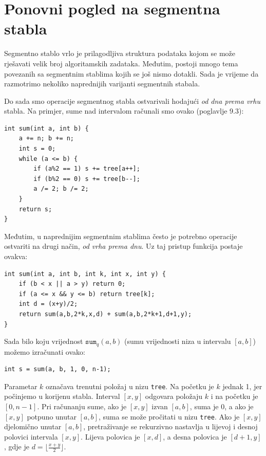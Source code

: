 \chapter{Ponovni pogled na segmentna stabla}


Segmentno stablo vrlo je prilagodljiva struktura podataka
kojom se može rješavati velik broj algoritamskih zadataka.
Međutim, postoji mnogo tema povezanih sa segmentnim stablima
kojih se još nismo dotakli.
Sada je vrijeme da razmotrimo nekoliko naprednijih varijanti
segmentnih stabala.

Do sada smo operacije segmentnog stabla
ostvarivali hodajući \emph{od dna prema vrhu}
stabla.
Na primjer, sume nad intervalom
računali smo ovako (poglavlje 9.3):

\begin{lstlisting}
int sum(int a, int b) {
    a += n; b += n;
    int s = 0;
    while (a <= b) {
        if (a%2 == 1) s += tree[a++];
        if (b%2 == 0) s += tree[b--];
        a /= 2; b /= 2;
    }
    return s;
}
\end{lstlisting}

Međutim, u naprednijim segmentnim stablima
često je potrebno operacije ostvariti
na drugi način, \emph{od vrha prema dnu}.
Uz taj pristup funkcija postaje ovakva:
\begin{lstlisting}
int sum(int a, int b, int k, int x, int y) {
    if (b < x || a > y) return 0;
    if (a <= x && y <= b) return tree[k];
    int d = (x+y)/2;
    return sum(a,b,2*k,x,d) + sum(a,b,2*k+1,d+1,y);
}
\end{lstlisting}

Sada bilo koju vrijednost $\texttt{sum}_q(a,b)$
(sumu vrijednosti niza u intervalu $[a,b]$) možemo izračunati ovako:
\begin{lstlisting}
int s = sum(a, b, 1, 0, n-1);
\end{lstlisting}

Parametar $k$ označava trenutni položaj
u nizu \texttt{tree}.
Na početku je $k$ jednak 1, jer počinjemo
u korijenu stabla.
Interval $[x,y]$ odgovara položaju $k$
i na početku je $[0,n-1]$.
Pri računanju sume,
ako je $[x,y]$ izvan $[a,b]$,
suma je 0,
a ako je $[x,y]$ potpuno unutar $[a,b]$,
suma se može pročitati u nizu \texttt{tree}.
Ako je $[x,y]$ djelomično unutar $[a,b]$,
pretraživanje se rekurzivno nastavlja u
lijevoj i desnoj polovici intervala $[x,y]$.
Lijeva polovica je $[x,d]$,
a desna polovica je $[d+1,y]$,
gdje je $d=\lfloor \frac{x+y}{2} \rfloor$.

